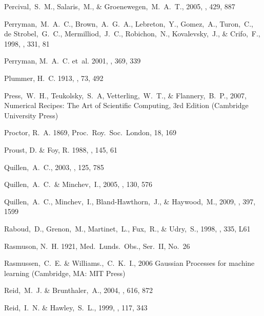 \begin{thebibliography}{99}
  Percival,~S.~M., Salaris,~M., \& Groenewegen,~M.~A.~T., 2005,
  \aap, 429, 887

  Perryman,~M.~A.~C., Brown,~A.~G.~A., Lebreton,~Y., Gomez,~A., Turon,~C., de Strobel,~G.~C., Mermilliod,~J.~C., Robichon,~N., Kovalevsky,~J., \& Crifo,~F., 1998,
  \aap, 331, 81

{Perryman}, M.~A.~C. {et~al.} 2001, \aap, 369, 339

{Plummer}, H.~C. 1913, \mnras, 73, 492

  Press,~W.~H., Teukolsky,~S.~A, Vetterling,~W.~T., \& Flannery,~B.~P., 2007,
  Numerical Recipes: The Art of Scientific Computing, 3rd Edition (Cambridge University Press)

{Proctor}, R.~A. 1869, Proc.~Roy.~Soc.~London, 18, 169

{Proust}, D. \& {Foy}, R. 1988, \apss, 145, 61

  Quillen,~A.~C., 2003, 
  \aj, 125, 785

  Quillen,~A.~C.~\& Minchev,~I., 2005,
  \aj, 130, 576

  Quillen,~A.~C., Minchev,~I., Bland-Hawthorn,~J., \& Haywood,~M., 2009, \mnras, 397, 1599

  Raboud,~D., Grenon,~M., Martinet,~L., Fux,~R., \& Udry,~S., 1998,
  \aap, 335, L61

{Rasmuson}, N.~H. 1921, Med.~Lunds.~Obs., {Ser.~II}, {No.~26}

  Rasmussen,~C.~E. \& Williams.,~C.~K.~I., 2006
  Gaussian Processes for machine learning (Cambridge, MA: MIT Press)

  Reid,~M.~J. \& Brunthaler,~A., 2004,
  \apj, 616, 872

  Reid,~I.~N. \& Hawley,~S.~L., 1999,
  \aj, 117, 343


\end{thebibliography}
